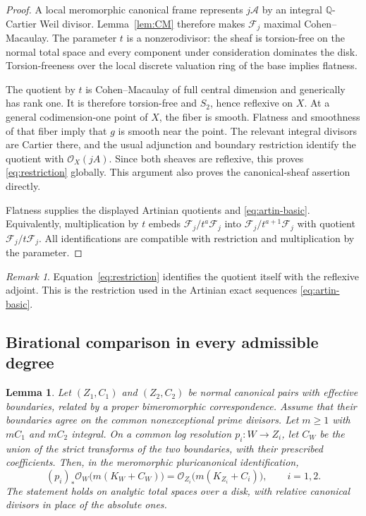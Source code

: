 \documentclass[11pt,a4paper]{article}
\numberwithin{equation}{section}
\newtheorem{lemma}[theorem]{Lemma}
\theoremstyle{definition}
\theoremstyle{remark}
\newtheorem{remark}[theorem]{Remark}
\newcommand{\Q}{\mathbb Q}\newcommand{\R}{\mathbb R}
\newcommand{\OO}{\mathcal O}\newcommand{\cX}{\mathcal X}
\newcommand{\cA}{\mathcal A}\newcommand{\cF}{\mathcal F}
\begin{document}
\begin{proof}
A local meromorphic canonical frame represents $j\cA$ by an integral
$\Q$-Cartier Weil divisor. Lemma~\ref{lem:CM} therefore makes
$\cF_j$ maximal Cohen--Macaulay. The parameter
$t$ is a nonzerodivisor: the sheaf is torsion-free on the normal total
space and every component under consideration dominates the disk.
Torsion-freeness over the local discrete valuation ring of the base
implies flatness.

The quotient by $t$ is Cohen--Macaulay of full central dimension and
generically has rank one. It is therefore torsion-free and $S_2$, hence
reflexive on $X$. At a general codimension-one point of $X$, the fiber is smooth.
Flatness and smoothness of that fiber imply that $g$ is smooth near
the point. The relevant integral divisors are Cartier there, and the
usual adjunction and boundary restriction identify the quotient with
$\OO_X(jA)$. Since both sheaves are reflexive, this proves
\eqref{eq:restriction} globally. This argument also proves the
canonical-sheaf assertion directly.

Flatness supplies the displayed Artinian quotients and
\eqref{eq:artin-basic}. Equivalently, multiplication by $t$ embeds
$\cF_j/t^a\cF_j$ into $\cF_j/t^{a+1}\cF_j$ with quotient
$\cF_j/t\cF_j$. All identifications are compatible with restriction
and multiplication by the parameter.
\end{proof}

\begin{remark}\label{rem:nonCartier}
Equation~\eqref{eq:restriction} identifies the quotient itself with the
reflexive adjoint. This is the restriction used in the Artinian exact
sequences \eqref{eq:artin-basic}.
\end{remark}

\subsection{Birational comparison in every admissible degree}

\begin{lemma}\label{lem:birational}
Let $(Z_1,C_1)$ and $(Z_2,C_2)$ be normal canonical pairs with effective
boundaries, related by a
proper bimeromorphic correspondence. Assume that their boundaries
agree on the common nonexceptional prime divisors. Let $m\ge1$ with
$mC_1$ and $mC_2$ integral. On a common log resolution
$p_i:W\to Z_i$, let $C_W$ be the union of the strict transforms of
the two boundaries, with their prescribed coefficients. Then, in the
meromorphic pluricanonical identification,
\begin{equation}\label{eq:birational-sheaf}
 (p_i)_*\OO_W\bigl(m(K_W+C_W)\bigr)
 =\OO_{Z_i}\bigl(m(K_{Z_i}+C_i)\bigr),\qquad i=1,2.
\end{equation}
The statement holds on analytic total spaces over a disk, with relative
canonical divisors in place of the absolute ones.
\end{lemma}
\end{document}

